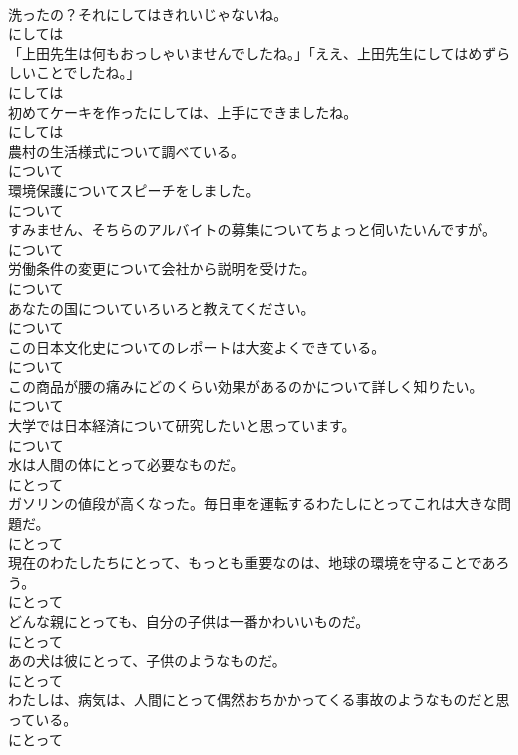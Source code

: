 \documentclass[8pt]{extreport}
\begin{document}
\begin{CJK}{UTF8}{min}
\\	洗ったの？それにしてはきれいじゃないね。	
\\	にしては	
\\	「上田先生は何もおっしゃいませんでしたね。」「ええ、上田先生にしてはめずらしいことでしたね。」	
\\	にしては	
\\	初めてケーキを作ったにしては、上手にできましたね。	
\\	にしては	
\\	農村の生活様式について調べている。	
\\	について	
\\	環境保護についてスピーチをしました。	
\\	について	
\\	すみません、そちらのアルバイトの募集についてちょっと伺いたいんですが。	
\\	について	
\\	労働条件の変更について会社から説明を受けた。	
\\	について	
\\	あなたの国についていろいろと教えてください。	
\\	について	
\\	この日本文化史についてのレポートは大変よくできている。	
\\	について	
\\	この商品が腰の痛みにどのくらい効果があるのかについて詳しく知りたい。	
\\	について	
\\	大学では日本経済について研究したいと思っています。	
\\	について	
\\	水は人間の体にとって必要なものだ。	
\\	にとって	
\\	ガソリンの値段が高くなった。毎日車を運転するわたしにとってこれは大きな問題だ。	
\\	にとって	
\\	現在のわたしたちにとって、もっとも重要なのは、地球の環境を守ることであろう。	
\\	にとって	
\\	どんな親にとっても、自分の子供は一番かわいいものだ。	
\\	にとって	
\\	あの犬は彼にとって、子供のようなものだ。	
\\	にとって	
\\	わたしは、病気は、人間にとって偶然おちかかってくる事故のようなものだと思っている。	
\\	にとって	

\end{CJK}
\end{document}
